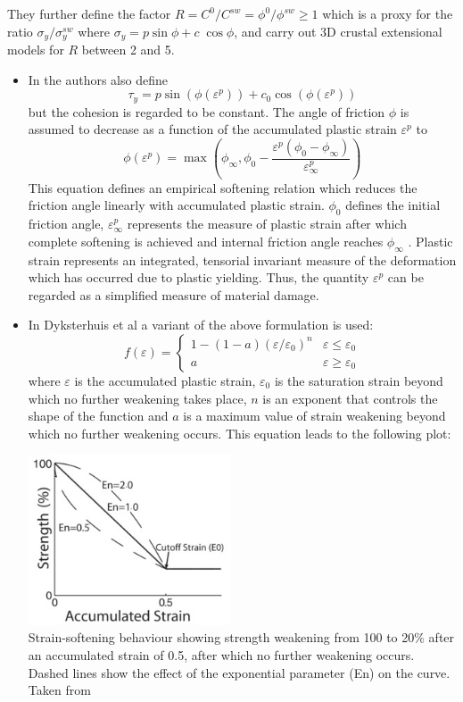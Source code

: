 They further define the factor $R=C^0/C^{sw}=\phi^0/\phi^{sw}\geq 1$ which is a proxy
for the ratio $\sigma_y/\sigma_y^{sw}$ where $\sigma_y=p \sin\phi + c \; \cos \phi$, 
and carry out 3D crustal extensional models for $R$ between 2 and 5. 


\begin{itemize}
\item In \cite{lemh17} the authors also define 
\[
\tau_y = p \sin (\phi(\varepsilon^p))  + c_0 \cos(\phi(\varepsilon^p))
\]
but the cohesion is regarded to be constant. 
The angle of friction $\phi$ is assumed to decrease as a function of the accumulated plastic
strain $\varepsilon^p$ to
\[
\phi(\varepsilon^p) 
=
\max \left(
\phi_\infty , \phi_0 - \frac{\varepsilon^p (\phi_0-\phi_\infty)}{\varepsilon^p_\infty}
\right)
\]
This equation defines an empirical softening relation which reduces the
friction angle linearly with accumulated plastic strain.
$\phi_0$ defines the initial friction angle, $\varepsilon^p_\infty$
represents the measure of plastic strain after which complete softening is achieved and internal
friction angle reaches $\phi_\infty$ . Plastic strain represents an integrated,
tensorial invariant measure of the deformation which has occurred
due to plastic yielding. Thus, the quantity $\varepsilon^p$ can be regarded as
a simplified measure of material damage. 


\item In Dyksterhuis et al \cite{dyrm07} a variant of the above formulation is used:
\[
f(\varepsilon)=
\left\{
\begin{array}{cc} 
1-(1-a)(\varepsilon/\varepsilon_0)^n & \varepsilon \leq \varepsilon_0 \\
a &  \varepsilon \geq \varepsilon_0 
\end{array}
\right.
\]
where $\varepsilon$ is the accumulated plastic strain, $\varepsilon_0$ is the
saturation strain beyond which no further weakening
takes place, $n$ is an exponent that controls the shape
of the function and $a$ is a maximum value of strain
weakening beyond which no further weakening
occurs. This equation leads to the following plot:

\begin{center}
\includegraphics[width=6cm]{images/strainweakening/dyrm07}\\
{\tiny Strain-softening behaviour showing strength weakening from 100 to 20\% 
after an accumulated strain of 0.5, after which no further weakening occurs. 
Dashed lines show the effect of the exponential parameter
(En) on the curve. Taken from \cite{dyrm07}}
\end{center}


\end{itemize}
